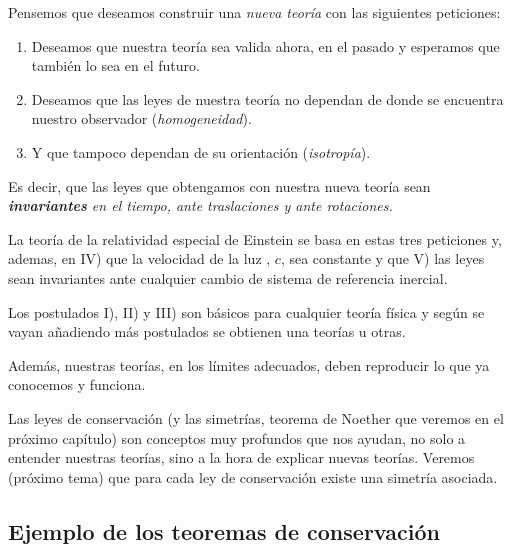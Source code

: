 \vspace{10mm}

Pensemos que deseamos construir una \emph{nueva teoría} con las siguientes peticiones:

\begin{enumerate}[I ]
\item  Deseamos que nuestra teoría sea valida ahora, en el pasado y esperamos que también lo sea en el futuro.
\item  Deseamos que las leyes de nuestra teoría no dependan de donde se encuentra nuestro observador (\emph{homogeneidad}).
\item Y que tampoco dependan de su orientación (\emph{isotropía}).
\end{enumerate}

Es decir, que las leyes que obtengamos con nuestra nueva teoría sean \emph{\textbf{invariantes} en el tiempo, ante traslaciones y ante rotaciones.}

\textcolor{gris}{La teoría de la relatividad especial de Einstein se basa en estas tres peticiones y, ademas, en IV) que la velocidad de la luz , $c$, sea constante y que V) las leyes sean invariantes ante cualquier cambio de sistema de referencia inercial}.

Los postulados I), II) y III) son básicos para cualquier teoría física y según se vayan añadiendo más postulados se obtienen una teorías u otras.

Además, nuestras teorías, en los límites adecuados, deben reproducir lo que ya conocemos y funciona.

Las leyes de conservación (y las simetrías, teorema de Noether que veremos en el próximo capítulo) son conceptos muy profundos que nos ayudan, no solo a entender nuestras teorías, sino a la hora de explicar nuevas teorías. Veremos (próximo tema) que para cada ley de conservación existe una simetría asociada.



\vspace{10mm}


\subsection{Ejemplo de los teoremas de conservación}
\vspace{0.5cm}


